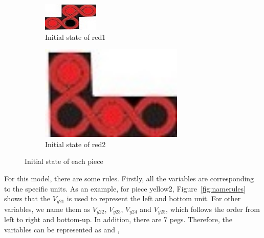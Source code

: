 \begin{figure}[htbp]
\begin{subfigure}[b]{.24\textwidth}
\centering
\includegraphics[width =\textwidth]{figs/red1.jpg}
\caption{Initial state of red1}
  \label{fig:2Dred1}
\end{subfigure}
\begin{subfigure}[b]{.24\textwidth}
\centering
\includegraphics[width=0.75\textwidth]{figs/red2.jpg}
\caption{Initial state of red2}
  \label{fig:2Dred2}
\end{subfigure}
\caption{Initial state of each piece}
  \label{fig:allinit}
\end{figure}
For this model, there are some rules. Firstly, all the variables are corresponding to the specific units. As an example, for piece yellow2, Figure~\ref{fig:namerules} shows that the $V_{y21}$ is used to represent the left and bottom unit. For other variables, we name them as $V_{y22}$, $V_{y23}$, $V_{y24}$ and $V_{y25}$, which follows the order from left to right and bottom-up. In addition, there are 7 pegs. Therefore, the variables can be represented as \VUnits and \VPegs,
